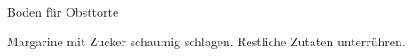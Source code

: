 \begin{recipe}[\vegetarian]{Boden für Obsttorte}

    \begin{ingredients}
    \end{ingredients}

    \begin{instructions}
        Margarine mit Zucker schaumig schlagen.
        Restliche Zutaten unterrühren.
    \end{instructions}
\end{recipe}
